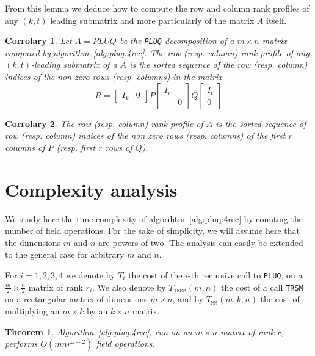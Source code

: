 \documentclass{article}
\newcommand{\pluq}{\texttt{PLUQ}\xspace}
\newcommand{\trsm}{\texttt{TRSM}\xspace}
\newcommand{\MM}{\texttt{MM}\xspace}
\newcommand{\GO}[1]{\ensuremath{O\left(#1\right)}\xspace}
\newtheorem{theorem}{Theorem}
\newtheorem{corrolary}{Corrolary}
\begin{document}
From this lemma we deduce how to compute the row and column rank profiles of any
$(k,t)$ leading submatrix and more particularly of the matrix $A$ itself.

\begin{corrolary}
  Let $A=PLUQ$ be the \pluq decomposition of a $m\times n$ matrix computed by  algorithm~\ref{alg:pluq:4rec}.
  The row (resp. column) rank profile of any $(k,t)$-leading submatrix of a
   $A$ is the sorted sequence of the row
  (resp. column) indices of the non zero rows (resp. columns) in the matrix 
$$  R=\begin{bmatrix} I_k& 0 \end{bmatrix}
  P
  \begin{bmatrix} I_r\\&0\end{bmatrix}
  Q
  \begin{bmatrix} I_t\\0 \end{bmatrix}
  $$
\end{corrolary}

\begin{corrolary}
  The row (resp. column) rank profile of $A$ is the sorted sequence of row
  (resp. column) indices of the non zero rows (resp. columns) of the first $r$
  columns of $P$ (resp. first $r$ rows of $Q$).
\end{corrolary}
 \section{Complexity analysis}\label{sec:comp}

We study here the time complexity of algorihtm~\ref{alg:pluq:4rec} by counting
the number of field operations.
For the sake of simplicity, we will assume here that the dimensions $m$ and $n$
are powers of two. The analysis can easily be extended to the general case for
arbitrary $m$ and $n$.

For $i=1,2, 3, 4$ we denote by $T_i$ the cost of the $i$-th recursive call to
\pluq, on a $\frac{m}{2}\times\frac{n}{2}$ matrix of rank $r_i$.
We also denote by $T_\trsm(m,n)$ the cost of a call \trsm on a rectangular
matrix of dimensions $m\times n$, and by $T_\MM(m,k,n)$ the cost of multiplying
an $m\times k$ by an $k\times n$ matrix.

\begin{theorem}
  Algorithm~\ref{alg:pluq:4rec}, run on an $m\times n$ matrix of rank
  $r$, performs $\GO{mnr^{\omega-2}}$ field operations.
\end{theorem}
\end{document}
